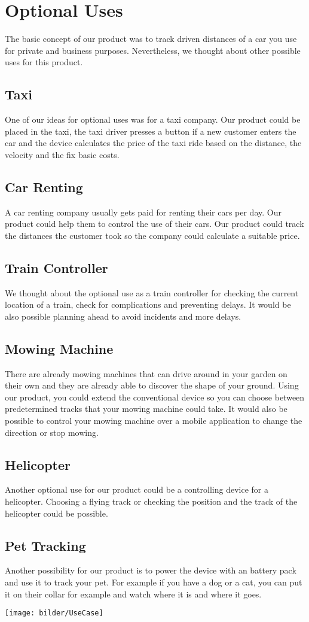 \chapter{Optional Uses}
The basic concept of our product was to track driven distances of a car you use for private and business purposes. Nevertheless, we thought about other possible uses for this product.
\section{Taxi}
One of our ideas for optional uses was for a taxi company. Our product could be placed in the taxi, the taxi driver presses a button if a new customer enters the car and the device calculates the price of the taxi ride based on the distance, the velocity and the fix basic costs. 
\section{Car Renting}
A car renting company usually gets paid for renting their cars per day. Our product could help them to control the use of their cars. Our product could track the distances the customer took so the company could calculate a suitable price. 
\section{Train Controller}
We thought about the optional use as a train controller for checking the current location of a train, check for complications and preventing delays. It would be also possible planning ahead to avoid incidents and more delays.
\section{Mowing Machine}
There are already mowing machines that can drive around in your garden on their own and they are already able to discover the shape of your ground. Using our product, you could extend the conventional device so you can choose between predetermined tracks that your mowing machine could take. It would also be possible to control your mowing machine over a mobile application to change the direction or stop mowing.
\section{Helicopter}
Another optional use for our product could be a controlling device for a helicopter. Choosing a flying track or checking the position and the track of the helicopter could be possible.
\section{Pet Tracking}
Another possibility for our product is to power the device with an battery pack and use it to track your pet. For example if you have a dog or a cat, you can put it on their collar for example and watch where it is and where it goes.
\begin{center}
\texttt{[image: bilder/UseCase]}
\end{center}
\clearpageauthor